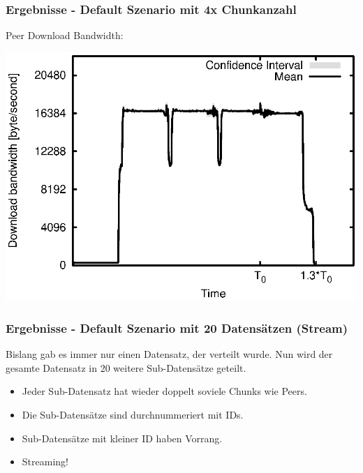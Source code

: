 \begin{frame}
  \frametitle{Ergebnisse - Default Szenario mit 4x Chunkanzahl}
  Peer Download Bandwidth:
  
  \begin{center}
    \includegraphics[width=1\textwidth]{fig/plots/scenario_15_chunk_count_fac_4/plots/GeneratedMeanCurrentDownloadBandwidth.csv.eps}
  \end{center}
\end{frame}




\begin{frame}
  \frametitle{Ergebnisse - Default Szenario mit 20 Datensätzen (Stream)}
  Bislang gab es immer nur einen Datensatz, der verteilt wurde. Nun wird der gesamte Datensatz in 20 weitere Sub-Datensätze geteilt.

  \begin{itemize}  
    \item Jeder Sub-Datensatz hat wieder doppelt soviele Chunks wie Peers.
    \item Die Sub-Datensätze sind durchnummeriert mit IDs.
    \item Sub-Datensätze mit kleiner ID haben Vorrang.
    \item Streaming!
  \end{itemize}	
\end{frame}


